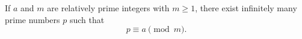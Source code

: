 If $a$ and $m$ are relatively prime integers with $m \geq 1$, there exist infinitely many prime numbers $p$ such that
$$
p \equiv a \pmod{m}.
$$
